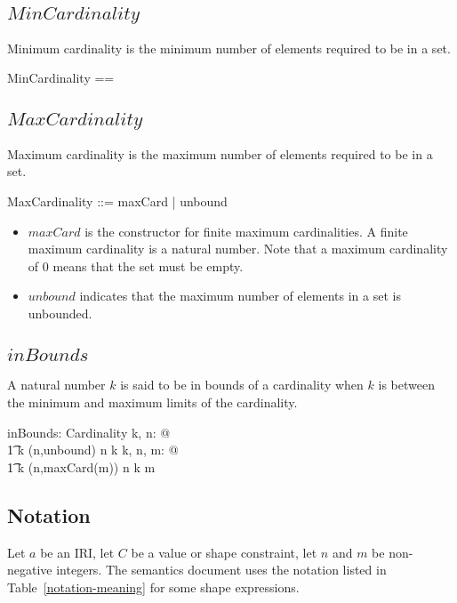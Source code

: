 \documentclass{article}
\begin{document}
\subsection{$MinCardinality$}
Minimum cardinality is the minimum number of elements required to be in a set.
\begin{zed}
	MinCardinality == \nat
\end{zed}

\subsection{$MaxCardinality$}
Maximum cardinality is the maximum number of elements required to be in a set.
\begin{zed}
	MaxCardinality ::= maxCard \ldata \nat \rdata | unbound
\end{zed}
\begin{itemize}
\item $maxCard$ is the constructor for finite maximum cardinalities.
A finite maximum cardinality is a natural number.
Note that a maximum cardinality of $0$ means that the set must be empty.
\item $unbound$ indicates that the maximum number of elements in a set is unbounded.
\end{itemize}

\subsection{$inBounds$}
A natural number $k$ is said to be in bounds of a cardinality when $k$ is between the minimum and maximum
limits of the cardinality.
\begin{axdef}
	inBounds: \nat \rel Cardinality
\where
	\forall k, n: \nat @ \\
\t1		k  (n,unbound) \iff n \leq k
\also
	\forall k, n, m: \nat @ \\
\t1		k  (n,maxCard(m)) \iff n \leq k \leq m
\end{axdef}

\subsection{Notation}
Let $a$ be an IRI, let $C$ be a value or shape constraint, let $n$ and $m$ be non-negative integers.
The semantics document uses the notation listed in Table~\ref{notation-meaning} for some shape expressions.
\end{document}
